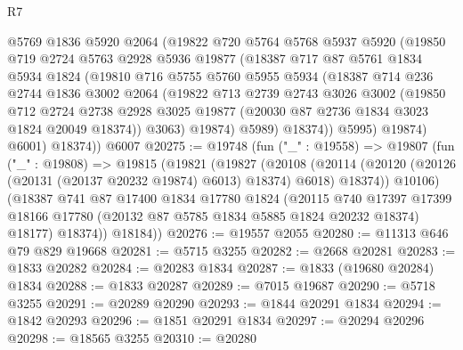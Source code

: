 \begin{lexlean}{R7}
\begin{coremodule}
            @5769
            @1836
            @5920
            @2064
            (@19822
              @720
              @5764
              @5768
              @5937
              @5920
              (@19850
                @719
                @2724
                @5763
                @2928
                @5936
                @19877
                (@18387
                  @717
                  @87
                  @5761
                  @1834
                  @5934
                  @1824
                  (@19810
                    @716
                    @5755
                    @5760
                    @5955
                    @5934
                    (@18387
                      @714
                      @236
                      @2744
                      @1836
                      @3002
                      @2064
                      (@19822
                        @713
                        @2739
                        @2743
                        @3026
                        @3002
                        (@19850
                          @712
                          @2724
                          @2738
                          @2928
                          @3025
                          @19877
                          (@20030 @87 @2736 @1834 @3023 @1824 @20049 @18374))
                        @3063)
                      @19874)
                    @5989)
                  @18374))
              @5995)
            @19874)
          @6001)
        @18374))
    @6007
@20275 := @19748
    (fun ("_" : @19558) =>
    @19807
      (fun ("_" : @19808) =>
      @19815
        (@19821
          (@19827
            (@20108
              (@20114 (@20120 (@20126 (@20131 (@20137 @20232 @19874) @6013) @18374) @6018) @18374))
            @10106)
          (@18387
            @741
            @87
            @17400
            @1834
            @17780
            @1824
            (@20115
              @740
              @17397
              @17399
              @18166
              @17780
              (@20132 @87 @5785 @1834 @5885 @1824 @20232 @18374)
              @18177)
            @18374))
        @18184))
@20276 := @19557 @2055
@20280 := @11313 @646 @79 @829 @19668
@20281 := @5715 @3255
@20282 := @2668 @20281
@20283 := @1833 @20282
@20284 := @20283 @1834
@20287 := @1833 (@19680 @20284) @1834
@20288 := @1833 @20287
@20289 := @7015 @19687
@20290 := @5718 @3255
@20291 := @20289 @20290
@20293 := @1844 @20291 @1834
@20294 := @1842 @20293
@20296 := @1851 @20291 @1834
@20297 := @20294 @20296
@20298 := @18565 @3255
@20310 := @20280

\end{coremodule}
\end{lexlean}
